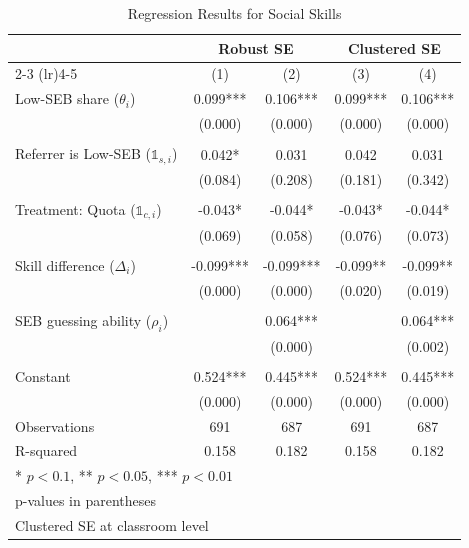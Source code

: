 \documentclass[11pt,a4paper,oneside]{article}
\begin{document}
\begin{table}
\centering
\caption{Regression Results for Social Skills}
\begin{tabular}{@{}lcccc@{}}
\toprule
 & \multicolumn{2}{c}{Robust SE} & \multicolumn{2}{c}{Clustered SE} \\
 \cmidrule(lr){2-3} \cmidrule(lr){4-5}
 & (1) & (2) & (3) & (4) \\ \midrule
Low-SEB share ($\theta_i$) & 0.099*** & 0.106*** & 0.099*** & 0.106*** \\
 & (0.000) & (0.000) & (0.000) & (0.000) \\
 \\
Referrer is Low-SEB ($\mathds{1}_{s,i}$) & 0.042* & 0.031 & 0.042 & 0.031 \\
 & (0.084) & (0.208) & (0.181) & (0.342) \\
 \\
Treatment: Quota ($\mathds{1}_{c,i}$) & -0.043* & -0.044* & -0.043* & -0.044* \\
 & (0.069) & (0.058) & (0.076) & (0.073) \\
 \\
Skill difference ($\Delta_{i}$) & -0.099*** & -0.099*** & -0.099** & -0.099** \\
 & (0.000) & (0.000) & (0.020) & (0.019) \\
 \\
SEB guessing ability ($\rho_i$) & & 0.064*** & & 0.064*** \\
 & & (0.000) & & (0.002) \\
 \\
Constant & 0.524*** & 0.445*** & 0.524*** & 0.445*** \\
 & (0.000) & (0.000) & (0.000) & (0.000) \\ \midrule
Observations & 691 & 687 & 691 & 687 \\
R-squared & 0.158 & 0.182 & 0.158 & 0.182 \\ \midrule
\multicolumn{5}{l}{* $p<0.1$, ** $p<0.05$, *** $p<0.01$} \\
\multicolumn{5}{l}{p-values in parentheses} \\
\multicolumn{5}{l}{Clustered SE at classroom level}
\end{tabular}
\label{tab:regression-results-social}
\end{table}
\end{document}
